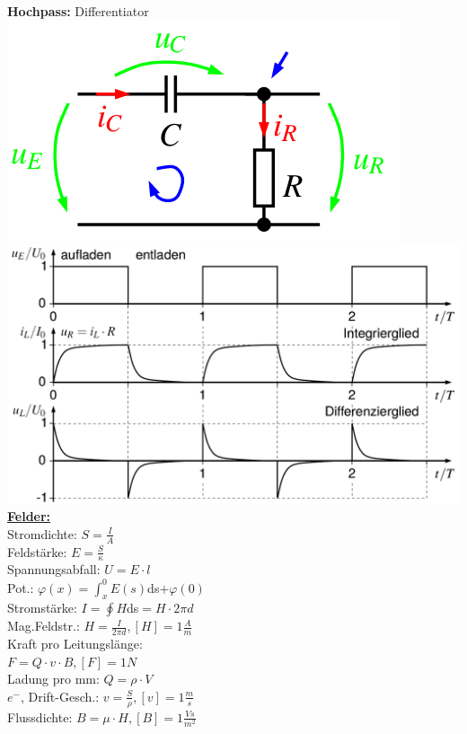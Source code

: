 \documentclass[8pt]{extarticle}
\begin{document}
\begin{minipage}{0.33\textwidth}
\textbf{Hochpass:} Differentiator\\
\includegraphics[scale=0.3]{hochpass.png}\\
\includegraphics[scale=0.1]{hochpassuit.png}\\
\underline{\textbf{Felder:}}\\
Stromdichte: $S=\frac{I}{A}$\\
Feldstärke: $E=\frac{S}{\kappa}$\\
Spannungsabfall: $U=E \cdot l$\\
Pot.: $\varphi (x)= \int_x^0 E(s)$ds$ + \varphi(0)$\\
Stromstärke: $I = \oint H $ds$ = H \cdot 2\pi d$\\
Mag.Feldstr.: $H = \frac{I}{2\pi d}, [H] = 1\frac{A}{m}$\\
Kraft pro Leitungslänge:\\
\phantom{ss} $F=Q \cdot v \cdot B, [F] = 1N$\\
Ladung pro mm: $Q = \rho \cdot V$\\
$e^-$, Drift-Gesch.: $v = \frac{S}{\rho}, [v] = 1\frac{m}{s}$\\
Flussdichte: $B=\mu \cdot H, [B] = 1 \frac{Vs}{m^2}$\\
 

\end{minipage}
\end{document}
